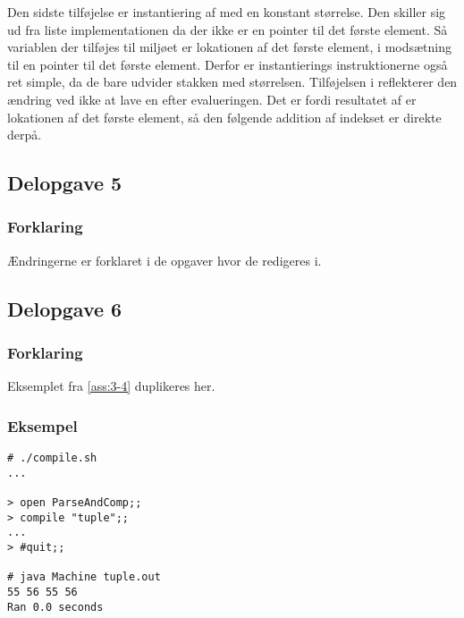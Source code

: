 Den sidste tilføjelse er instantiering af  med en konstant størrelse. Den skiller sig ud fra liste implementationen da der ikke er en pointer til det første element. Så variablen der tilføjes til miljøet er lokationen af det første element, i modsætning til en pointer til det første element. Derfor er instantierings instruktionerne også ret simple, da de bare udvider stakken med størrelsen. Tilføjelsen i  reflekterer den ændring ved ikke at lave en  efter  evalueringen. Det er fordi resultatet af  er lokationen af det første element, så den følgende addition af indekset er direkte derpå.

\subsection{Delopgave 5}\label{ass:3-5}
\subsubsection{Forklaring}
Ændringerne er forklaret i de opgaver hvor de redigeres i.

\subsection{Delopgave 6}\label{ass:3-6}
\subsubsection{Forklaring}
Eksemplet fra \ref{ass:3-4} duplikeres her.

\subsubsection{Eksempel}
\begin{lstlisting}
# ./compile.sh
...

> open ParseAndComp;;
> compile "tuple";;
...
> #quit;;

# java Machine tuple.out
55 56 55 56
Ran 0.0 seconds
\end{lstlisting}

